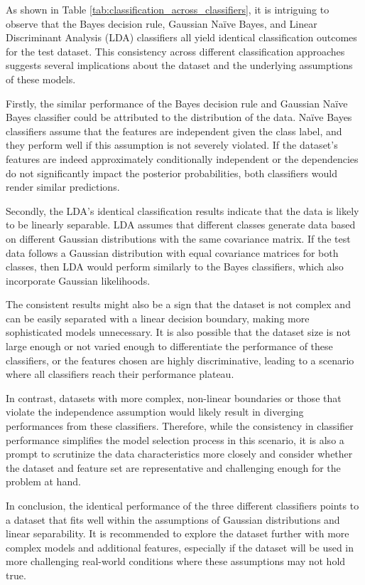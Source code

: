\documentclass[12pt, onecolumn]{article}
\begin{document}
As shown in Table \ref{tab:classification_across_classifiers}, it is intriguing to observe that the Bayes decision rule, Gaussian Naïve Bayes, and Linear Discriminant Analysis (LDA) classifiers all yield identical classification outcomes for the test dataset. This consistency across different classification approaches suggests several implications about the dataset and the underlying assumptions of these models.

Firstly, the similar performance of the Bayes decision rule and Gaussian Naïve Bayes classifier could be attributed to the distribution of the data. Naïve Bayes classifiers assume that the features are independent given the class label, and they perform well if this assumption is not severely violated. If the dataset's features are indeed approximately conditionally independent or the dependencies do not significantly impact the posterior probabilities, both classifiers would render similar predictions.

Secondly, the LDA's identical classification results indicate that the data is likely to be linearly separable. LDA assumes that different classes generate data based on different Gaussian distributions with the same covariance matrix. If the test data follows a Gaussian distribution with equal covariance matrices for both classes, then LDA would perform similarly to the Bayes classifiers, which also incorporate Gaussian likelihoods.

The consistent results might also be a sign that the dataset is not complex and can be easily separated with a linear decision boundary, making more sophisticated models unnecessary. It is also possible that the dataset size is not large enough or not varied enough to differentiate the performance of these classifiers, or the features chosen are highly discriminative, leading to a scenario where all classifiers reach their performance plateau.

In contrast, datasets with more complex, non-linear boundaries or those that violate the independence assumption would likely result in diverging performances from these classifiers. Therefore, while the consistency in classifier performance simplifies the model selection process in this scenario, it is also a prompt to scrutinize the data characteristics more closely and consider whether the dataset and feature set are representative and challenging enough for the problem at hand.

In conclusion, the identical performance of the three different classifiers points to a dataset that fits well within the assumptions of Gaussian distributions and linear separability. It is recommended to explore the dataset further with more complex models and additional features, especially if the dataset will be used in more challenging real-world conditions where these assumptions may not hold true.
\end{document}
